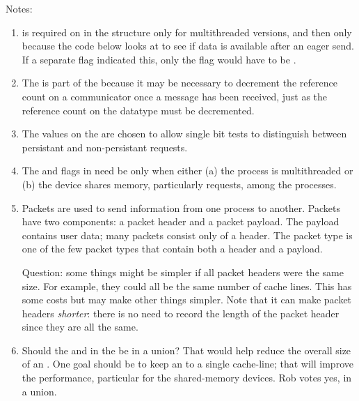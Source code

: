 Notes:
\begin{enumerate}
\item {} is required on  in the 
  structure only for multithreaded versions, and then only because the code
  below looks at  to see if data is available after an eager send.
  If a separate flag indicated this, only the flag would have to be
  . 

\item The  is part of the  because it may
  be necessary to decrement the reference count on a communicator once a
  message has been received, just as the reference count on the datatype must
  be decremented.  

\item The values on the  are chosen to allow single
  bit tests to distinguish between persistant and non-persistant requests.

\item The  and  flags in 
  need be 
   only when either (a) the process is multithreaded or (b) the
  device shares memory, particularly requests, among the processes.

\item Packets are used to send information from one process to another.
  Packets have two components: a packet header and a packet payload.  The
  payload contains user data; many packets consist only of a header. 
  The packet type  is one of the few packet types that
  contain both a header and a payload. 

  Question: some things might be simpler if all packet headers were the same
  size.  For example, they could all be the same number of cache lines.
  This has some costs but may make other things simpler.  Note that it can
  make packet headers \emph{shorter}: there is no need to record the length of
  the packet header since they are all the same.

\item Should the  and  in
  the  be in a
  union?  That would help reduce the overall size of an .
  One goal should be to keep an  to a single cache-line;
  that will improve the performance, particular for the shared-memory
  devices.
  Rob votes yes, in a union.
\end{enumerate}


